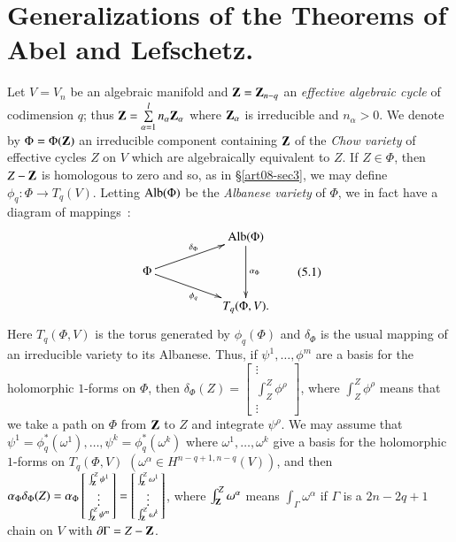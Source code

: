 \section{Generalizations of the Theorems of Abel and Lefschetz.}\label{art08-sec5}

Let $V=V_{n}$ be an algebraic manifold and $\mathbf{Z}=\mathbf{Z}_{n-q}$ an {\em effective algebraic cycle} of codimension $q$; thus $\mathbf{Z}=\sum\limits^{l}_{\alpha=1}n_{\alpha}\mathbf{Z}_{\alpha}$ where $\mathbf{Z}_{\alpha}$ is irreducible and $n_{\alpha}>0$. We denote by $\Phi=\Phi (\mathbf{Z})$ an irreducible component containing $\mathbf{Z}$ of the {\em Chow variety} \cite{art08-key13} of effective cycles $Z$ on $V$ which are algebraically equivalent to $Z$. If $Z\in \Phi$, then $Z-\mathbf{Z}$ is homologous to zero and so, as in \S\ref{art08-sec3}, we may define $\phi_{q}:\Phi\to T_{q}(V)$. Letting $\operatorname{\mathrm{Alb}}(\Phi)$ be the {\em Albanese variety} of $\Phi$, we in fact have a diagram of mappings~:
\begin{equation*}
\vcenter{
\xymatrix@C=1.8cm@R=.5cm{
 & \Alb(\Phi)\ar[dd]^-{\alpha_{\Phi}}\\
\Phi\ar[ur]^{\delta_{\Phi}}\ar[dr]_{\phi_{q}} &\\
 & T_{q}(\Phi,V).
}}\tag{5.1}\label{art08-sec5-eq5.1}
\end{equation*}
Here $T_{q}(\Phi,V)$ is the torus generated by $\phi_{q}(\Phi)$ and $\delta_{\Phi}$ is the usual mapping of an irreducible variety to its Albanese. Thus, if $\psi^{1},\ldots,\phi^{m}$ are a basis for the holomorphic $1$-forms on $\Phi$, then $\delta_{\Phi}(Z)=\left[\begin{smallmatrix}\vdots\\\int^{Z}_{Z}\phi^{\rho}\\\vdots\end{smallmatrix}\right]$, where $\int^{Z}_{Z}\phi^{\rho}$ means that we take a path on $\Phi$ from $\mathbf{Z}$ to $Z$ and integrate $\psi^{\rho}$. We may assume that $\psi^{1}=\phi^{*}_{q}(\omega^{1}),\ldots,\psi^{k}=\phi^{*}_{q}(\omega^{k})$ where $\omega^{1},\ldots,\omega^{k}$ give a basis for the holomorphic $1$-forms on $T_{q}(\Phi,V)$ $(\omega^{\alpha}\in H^{n-q+1,n-q}(V))$, and then $\alpha_{\Phi}\delta_{\Phi}(Z)=\alpha_{\Phi}\left[\begin{smallmatrix}\int^{Z}_{\mathbf{Z}}\psi^{1}\\\vdots\\\int^{Z}_{\mathbf{Z}}\psi^{m}\end{smallmatrix}\right]=\left[\begin{smallmatrix}\int^{Z}_{\mathbf{Z}}\omega^{1}\\\vdots\\\int^{Z}_{\mathbf{Z}}\omega^{k}\end{smallmatrix}\right]$, where $\int^{Z}_{\mathbf{Z}}\omega^{\alpha}$ means $\int_{\Gamma}\omega^{\alpha}$ if $\Gamma$ is a $2n-2q+1$ chain on $V$ with $\partial \Gamma=Z-\mathbf{Z}$.

